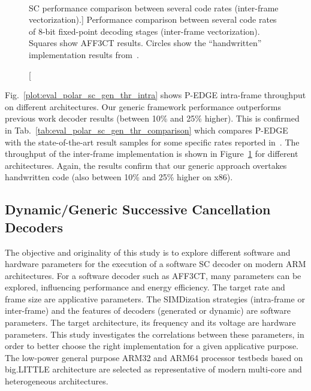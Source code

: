 \begin{figure}[htp]
  \centering
  \\
  \caption
    [SC performance comparison between several code rates (inter-frame
     vectorization).]
    {Performance comparison between several code rates of 8-bit fixed-point
    decoding stages (inter-frame vectorization). Squares show AFF3CT results.
    Circles show the ``handwritten'' implementation results
    from~\cite{LeGal2015a}.}
  \label{plot:eval_polar_sc_gen_thr_inter}
\end{figure}

Fig.~\ref{plot:eval_polar_sc_gen_thr_intra} shows P-EDGE intra-frame throughput
on different architectures. Our generic framework performance outperforms
previous work decoder results (between 10\% and 25\% higher). This is confirmed
in Tab.~\ref{tab:eval_polar_sc_gen_thr_comparison} which compares P-EDGE with
the state-of-the-art result samples for some specific rates reported
in~\cite{Sarkis2014}. The throughput of the inter-frame implementation is shown
in Figure~\ref{plot:eval_polar_sc_gen_thr_inter} for different architectures.
Again, the results confirm that our generic approach overtakes handwritten code
(also between 10\% and 25\% higher on x86).

\subsection{Dynamic/Generic Successive Cancellation Decoders}

The objective and originality of this study is to explore different software and
hardware parameters for the execution of a software SC decoder on modern ARM
architectures. For a software decoder such as AFF3CT, many parameters can be
explored, influencing performance and energy efficiency. The target rate and
frame size are applicative parameters. The SIMDization strategies (intra-frame
or inter-frame) and the features of decoders (generated or dynamic) are software
parameters. The target architecture, its frequency and its voltage are hardware
parameters. This study investigates the correlations between these parameters,
in order to better choose the right implementation for a given applicative
purpose. The low-power general purpose ARM32 and ARM64 processor testbeds based
on big.LITTLE architecture are selected as representative of modern multi-core
and heterogeneous architectures.

